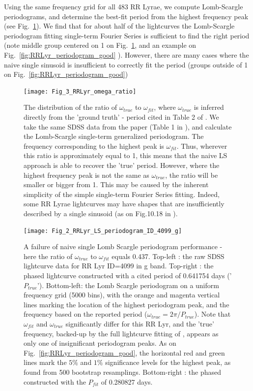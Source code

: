 \documentclass[fleqn,usenatbib]{mnras} %
\begin{document}
Using the same frequency grid for all 483 RR Lyrae, we compute Lomb-Scargle periodograms, and determine the best-fit period from the highest frequency peak (see Fig.~\ref{fig:RRLyr_period_ratios}).  We find that for about half of the lightcurves the Lomb-Scargle periodogram fitting single-term Fourier Series  is sufficient to find the right period (note middle group  centered on 1 on Fig.~\ref{fig:RRLyr_period_ratios}, and an example on Fig.~\ref{fig:RRLyr_periodogram_good} ). However, there are many cases  where the naive single sinusoid is insufficient to correctly fit the period (groups outside of 1 on Fig.~\ref{fig:RRLyr_periodogram_good})


\begin{figure}
\texttt{[image: Fig\_3\_RRLyr\_omega\_ratio]}
\caption{The distribution of the ratio of $\omega_{true}$ to $\omega_{fit}$, where $\omega_{true}$ is inferred directly from the 'ground truth' - period cited in Table 2 of \citep{sesar2010}. We take the same SDSS data from the paper (Table 1 in \citep{sesar2010}), and calculate the Lomb-Scargle single-term generalized periodogram. The frequency corresponding to the highest peak is  $\omega_{fit}$. Thus, wherever  this ratio is approximately equal to 1, this means that the naive  LS approach is able to recover the 'true' period.  However,  where the highest  frequency peak is not the same as $\omega_{true}$, the ratio will be smaller or bigger from 1. This may be caused by the inherent simplicity of the simple single-term Fourier Series fitting. Indeed, some RR Lyrae lightcurves may have shapes that are insufficiently described by a single sinusoid (as on Fig.10.18  in \citep{ivezic2014}). }
\label{fig:RRLyr_period_ratios}
\end{figure}


\begin{figure}
\texttt{[image: Fig\_2\_RRLyr\_LS\_periodogram\_ID\_4099\_g]}
\caption{ A failure of naive single Lomb Scargle periodogram performance - here the ratio of $\omega_{true}$ to $\omega_{fit}$ equals 0.437. Top-left : the raw  SDSS lightcurve data for RR Lyr ID=4099 in g band. Top-right : the phased lightcurve constructed with a cited period of 0.641754 days ('$P_{true}$'). Bottom-left: the Lomb Scargle periodogram on  a uniform frequency grid (5000 bins), with the orange and magenta vertical lines marking the location of the highest periodogram peak, and the frequency based on the reported period ($\omega_{true} = 2 \pi / P_{true}$). Note that $\omega_{fit}$ and $\omega_{true}$ significantly differ for this RR Lyr,  and the 'true' frequency, backed-up by the full lightcurve fitting of \citep{sesar2010}, appears as only one of insignificant periodogram peaks. As on Fig.~\ref{fig:RRLyr_periodogram_good},  the horizontal red and green lines mark the $5\%$ and $1\%$  significance levels for the highest peak, as found from 500 bootstrap resamplings.  Bottom-right : the phased constructed with the $P_{fit}$ of  0.280827 days. }
\label{fig:RRLyr_periodogram_fail1}
\end{figure}
%
\end{document}

